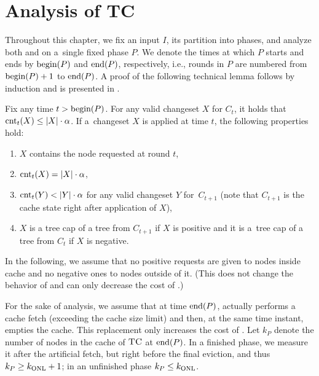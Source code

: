 

\section{Analysis of TC}
\label{sec:analysis}

Throughout this chapter, we fix an input $I$, its partition into phases, and
analyze both \ALGTC and \OPT on a~single fixed phase $P$. We denote the times at
which $P$ starts and ends by $\textrm{begin}(P)$ and $\textrm{end}(P)$, respectively, i.e., rounds in
$P$ are numbered from $\textrm{begin}(P)+1$ to $\textrm{end}(P)$. A proof of the following technical
lemma follows by induction and is presented in 
.


\begin{lemma}
\label{lem:no_over-requested_changesets}
Fix any time $t > \textrm{begin}(P)$. For any valid changeset $X$ for $C_t$, it holds that
$\textrm{cnt}_t(X) \leq |X| \cdot \alpha$. If a~changeset $X$ is applied at time $t$,
the following properties hold:
\begin{enumerate}
\item $X$ contains the node requested at round $t$, 
\label{lemit:1}
\item $\textrm{cnt}_t(X) = |X| \cdot \alpha$, 
\label{lemit:2}
\item $\textrm{cnt}_t(Y) < |Y| \cdot \alpha$ for any valid changeset $Y$ for~$C_{t+1}$
(note that $C_{t+1}$ is the cache state right after application of $X$),
\label{lemit:3}
\item $X$ is a tree cap of a tree from $C_{t+1}$ if
$X$ is positive and it is a~tree cap of a tree from $C_t$ if $X$ is
negative.
\label{lemit:4}
\end{enumerate}
\end{lemma}

In the following, we assume that no positive requests are given to nodes
inside cache and no negative ones to nodes outside of it. (This does not
change the behavior of \ALGTC and can only decrease the cost of \OPT.)

For the sake of analysis, we assume that at time $\textrm{end}(P)$, \ALGTC actually
performs a cache fetch (exceeding the cache size limit) and then, at the same
time instant, empties the cache. This replacement only increases the cost of
\ALGTC. Let $k_P$ denote the number of nodes in the cache of $\textsc{TC}$ at $\textrm{end}(P)$.
In a finished phase, we measure it after the artificial fetch, but right
before the final eviction, and thus $k_P \geq k_\textnormal{ONL} + 1$; in an unfinished
phase $k_P \leq k_\textnormal{ONL}$.

